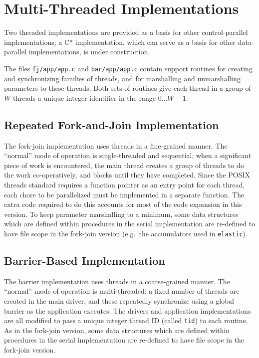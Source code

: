 \section{Multi-Threaded Implementations\label{s:thread}}

Two threaded implementations are provided
as a basis for other control-parallel implementations;
a C* implementation,
which can serve as a basis for other data-parallel implementations,
is under construction.

The files {\tt{fj/app/app.c}} and {\tt{bar/app/app.c}} contain support routines
for creating and synchronizing families of threads,
and for marshalling and unmarshalling parameters to these threads.
Both sets of routines give each thread in a group of $W$ threads
a unique integer identifier in the range $0{\ldots}W-1$.

\subsection{Repeated Fork-and-Join Implementation\label{s:thread-fj}}

The fork-join implementation uses threads in a fine-grained manner.
The ``normal'' mode of operation is single-threaded and sequential;
when a significant piece of work is encountered,
the main thread creates a group of threads to do the work co-operatively,
and blocks until they have completed.
Since the POSIX threads standard requires a function pointer
as an entry point for each thread,
each chore to be parallelized must be implemented in a separate function.
The extra code required to do this
accounts for most of the code expansion in this version.
To keep parameter marshalling to a minimum,
some data structures which are defined within procedures in the serial implementation
are re-defined to have file scope in the fork-join version
(e.g.\ the accumulators used in {\tt{elastic}}).

\subsection{Barrier-Based Implementation\label{s:thread-bar}}

The barrier implementation uses threads in a coarse-grained manner.
The ``normal'' mode of operation is multi-threaded:
a fixed number of threads are created in the main driver,
and these repeatedly synchronize using a global barrier as the application executes.
The drivers and application implementations are all modified to pass
a unique integer thread ID (called {\tt{tid}})
to each routine.
As in the fork-join version,
some data structures which are defined within procedures in the serial implementation
are re-defined to have file scope in the fork-join version.

